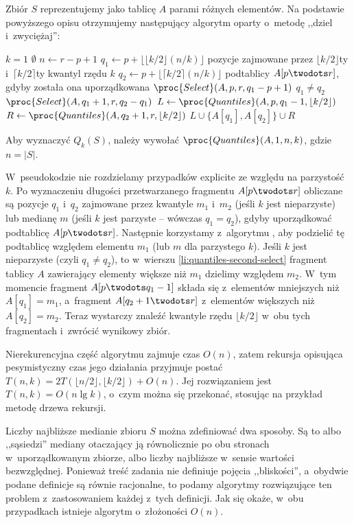 Zbiór $S$ reprezentujemy jako tablicę $A$ parami różnych elementów.
Na podstawie powyższego opisu otrzymujemy następujący algorytm oparty o~metodę ,,dziel i~zwyciężaj'':
\begin{codebox}
\li	\If $k=1$
\li		\Then \Return $\emptyset$
		\End
\li	$n\gets r-p+1$
\li	$q_1\gets p+\lfloor\lfloor k/2\rfloor(n/k)\rfloor$ \>\>\>\>\>\>\Comment pozycje zajmowane przez $\lfloor k/2\rfloor$\nbhyphen ty i~$\lceil k/2\rceil$\nbhyphen ty kwantyl rzędu $k$
\li	$q_2\gets p+\lfloor\lceil k/2\rceil(n/k)\rfloor$ \>\>\>\>\>\>\>podtablicy $A[p\twodots r]$, gdyby została ona uporządkowana
\li	$\proc{Select}(A,p,r,q_1-p+1)$
\li	\If $q_1\ne q_2$
\li		\Then $\proc{Select}(A,q_1+1,r,q_2-q_1)$ \label{li:quantiles-second-select}
		\End
\li	$L\gets\proc{Quantiles}(A,p,q_1-1,\lfloor k/2\rfloor)$
\li	$R\gets\proc{Quantiles}(A,q_2+1,r,\lfloor k/2\rfloor)$
\li	\Return $L\cup\{A[q_1],A[q_2]\}\cup R$
\end{codebox}
Aby wyznaczyć $Q_k(S)$, należy wywołać $\proc{Quantiles}(A,1,n,k)$, gdzie $n=|S|$.

W~pseudokodzie nie rozdzielamy przypadków explicite ze względu na parzystość $k$.
Po wyznaczeniu długości przetwarzanego fragmentu $A[p\twodots r]$ obliczane są pozycje $q_1$ i~$q_2$ zajmowane przez kwantyle $m_1$ i~$m_2$ (jeśli $k$ jest nieparzyste) lub medianę $m$ (jeśli $k$ jest parzyste -- wówczas $q_1=q_2$), gdyby uporządkować podtablicę $A[p\twodots r]$.
Następnie korzystamy z~algorytmu , aby podzielić tę podtablicę względem elementu $m_1$ (lub $m$ dla parzystego $k$).
Jeśli $k$ jest nieparzyste (czyli $q_1\ne q_2$), to w~wierszu \ref{li:quantiles-second-select} fragment tablicy $A$ zawierający elementy większe niż $m_1$ dzielimy względem $m_2$.
W~tym momencie fragment $A[p\twodots q_1-1]$ składa się z~elementów mniejszych niż $A[q_1]=m_1$, a~fragment $A[q_2+1\twodots r]$ z~elementów większych niż $A[q_2]=m_2$.
Teraz wystarczy znaleźć kwantyle rzędu $\lfloor k/2\rfloor$ w~obu tych fragmentach i~zwrócić wynikowy zbiór.

Nierekurencyjna część algorytmu zajmuje czas $O(n)$, zatem rekursja opisująca pesymistyczny czas jego działania przyjmuje postać $T(n,k)=2T(\lfloor n/2\rfloor,\lfloor k/2\rfloor)+O(n)$.
Jej rozwiązaniem jest $T(n,k)=O(n\lg k)$, o~czym można się przekonać, stosując na przykład metodę drzewa rekursji.

\exercise %
Liczby najbliższe medianie zbioru $S$ można zdefiniować dwa sposoby.
Są to albo ,,sąsiedzi'' mediany otaczający ją równolicznie po obu stronach w~uporządkowanym zbiorze, albo liczby najbliższe w~sensie wartości bezwzględnej.
Ponieważ treść zadania nie definiuje pojęcia ,,bliskości'', a~obydwie podane definicje są równie racjonalne, to podamy algorytmy rozwiązujące ten problem z~zastosowaniem każdej z~tych definicji.
Jak się okaże, w~obu przypadkach istnieje algorytm o~złożoności $O(n)$.

